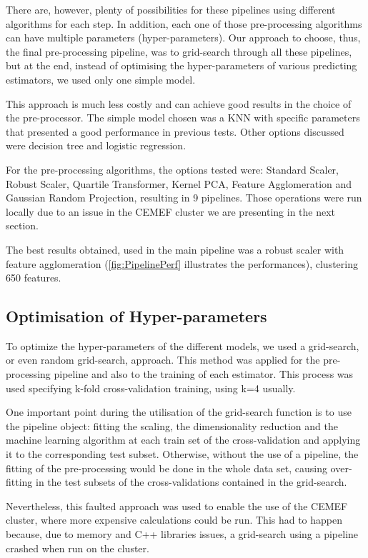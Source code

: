 \documentclass[letterpaper,11pt]{article}
\begin{document}
There are, however, plenty of possibilities for these pipelines using different algorithms for each step. In addition, each one of those pre-processing algorithms can have multiple parameters (hyper-parameters). Our approach to choose, thus, the final pre-processing pipeline, was to grid-search through all these pipelines, but at the end, instead of optimising the hyper-parameters of various predicting estimators, we used only one simple model.

This approach is much less costly and can achieve good results in the choice of the pre-processor. The simple model chosen was a KNN with specific parameters that presented a good performance in previous tests. Other options discussed were decision tree and logistic regression.

For the pre-processing algorithms, the options tested were: Standard Scaler, Robust Scaler, Quartile Transformer, Kernel PCA, Feature Agglomeration and Gaussian Random Projection, resulting in 9 pipelines. Those operations were run locally due to an issue in the CEMEF cluster we are presenting in the next section.

The best results obtained, used in the main pipeline was a robust scaler with feature agglomeration (\ref{fig:PipelinePerf} illustrates the performances), clustering 650 features.


\subsection{Optimisation of Hyper-parameters}

To optimize the hyper-parameters of the different models, we used a grid-search, or even random grid-search, approach. This method was applied for the pre-processing pipeline and also to the training of each estimator. This process was used specifying k-fold cross-validation training, using k=4 usually.

One important point during the utilisation of the grid-search function is to use the pipeline object: fitting the scaling, the dimensionality reduction and the machine learning algorithm at each train set of the cross-validation and applying it to the corresponding test subset. Otherwise, without the use of a pipeline, the fitting of the pre-processing would be done in the whole data set, causing over-fitting in the test subsets of the cross-validations contained in the grid-search.

Nevertheless, this faulted approach was used to enable the use of the CEMEF cluster, where more expensive calculations could be run. This had to happen because, due to memory and C++ libraries issues, a grid-search using a pipeline crashed when run on the cluster.
\end{document}
